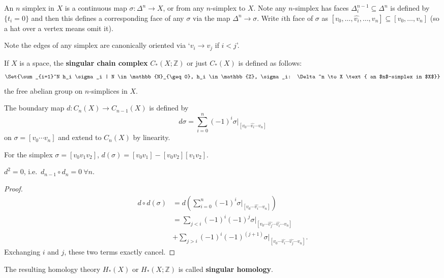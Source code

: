 \documentclass{article}
\begin{document}
An $n$ simplex in $X$ is a continuous map $\sigma: \Delta^n \to X$, or from any $n$-simplex to $X$.
Note any $n$-simplex has faces $\Delta_i^{n-1} \subseteq \Delta^n$ is defined by $\{t_i = 0\}$ and then this defines a corresponding face of any $\sigma$ via the map $\Delta^n \to \sigma$.
Write $i$th face of $\sigma$ as $[v_0, \dotsc, \hat{v_i}, \dotsc, v_n] \subseteq [v_0, \dotsc, v_n]$ (so a hat over a vertex means omit it).

Note the edges of any simplex are canonically oriented via `$v_i \to v_j$ if $i < j$'.

\begin{center}
  \begin{tikzpicture}

  \end{tikzpicture}
\end{center}
\begin{defi}
  If $X$ is a space, the \textbf{singular chain complex} $C_*(X; \mathbb{Z})$ or just $C_*(X)$ is defined as follows:
  \begin{equation*}
    \Set{\sum_{i=1}^N h_i \sigma_i | N \in \mathbb{N}_{\geq 0}, h_i \in \mathbb{Z}, \sigma_i: \Delta^n \to X \text{ an $n$-simplex in $X$}}
  \end{equation*}
  the free abelian group on $n$-simplices in $X$.
\end{defi}
\begin{defi}
  The boundary map $d: C_n(X) \to C_{n-1}(X)$ is defined by
  \begin{equation*}
    d \sigma = \sum_{i=0}^n (-1)^i \sigma|_{[v_0 \dotsm \hat{v_i} \dotsm v_n]}
  \end{equation*}
  on $\sigma=[v_0 \dotsm v_n]$ and extend to $C_n(X)$ by linearity.
\end{defi}
\begin{eg}
  For the simplex $\sigma = [v_0 v_1 v_2]$, $d(\sigma) = [v_0 v_1] - [v_0 v_2] [v_1 v_2]$.
\end{eg}
\begin{lemma}
  $d^2 = 0$, i.e.\ $d_{n-1} \circ d_n= 0 \ \forall n$.
\end{lemma}
\begin{proof}
  \begin{align*}
    d \circ d(\sigma) &= d(\sum_{i=0}^n (-1)^i \sigma|_{[v_0 \dotsm \hat{v_i} \dotsm v_n]})\\
                      &= \sum_{j < i} (-1)^i (-1)^j \sigma|_[v_0 \dotsm \hat{v_j} \dotsm \hat{v_i} \dotsm v_n]  \\
                      &+ \sum_{j > i} (-1)^i (-1)^(j+1) \sigma|_[v_0 \dotsm \hat{v_i} \dotsm \hat{v_j} \dotsm v_n].
  \end{align*}
  Exchanging $i$ and $j$, these two terms exactly cancel.
\end{proof}
The resulting homology theory $H_*(X)$ or $H_*(X; \mathbb{Z})$ is called \textbf{singular homology}.
\end{document}
